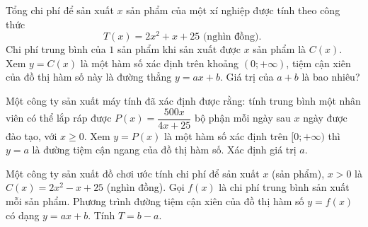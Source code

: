 \begin{bt}%
	Tổng chi phí để sản xuất $x$ sản phẩm của một xí nghiệp được tính theo công thức
	\[T(x)=2 x^2+x+25 \text { (nghìn đồng). }\]
	Chi phí trung bình của $1$ sản phẩm khi sản xuất được $x$ sản phẩm là $C(x)$. Xem $y=C(x)$ là một hàm số xác định trên khoảng $(0 ;+\infty)$, tiệm cận xiên của đồ thị hàm số này là đường thẳng $y=ax+b$. Giá trị của $a+b$ là bao nhiêu?
\end{bt}

\begin{bt}%
	Một công ty sản xuất máy tính đã xác định được rằng: tính trung bình một nhân viên có thể lắp ráp được $P(x)=\dfrac{500x}{4x+25}$ bộ phận mỗi ngày sau $x$ ngày được đào tạo, với $x \geq 0$. Xem $y=P(x)$ là một hàm số xác định trên $[0;+\infty)$ thì $y=a$ là đường tiệm cận ngang của đồ thị hàm số. Xác định giá trị $a$.
\end{bt}

\begin{bt}%
	Một công ty sản xuất đồ chơi ước tính chi phí để sản xuất $x$ (sản phẩm), $x>0$ là $C(x)=2x^2-x+25$ (nghìn đồng). Gọi $f(x)$ là chi phí trung bình sản xuất mỗi sản phẩm. Phương trình đường tiệm cận xiên của đồ thị hàm số $y=f(x)$ có dạng $y=ax+b$. Tính $T=b-a$.
\end{bt}

